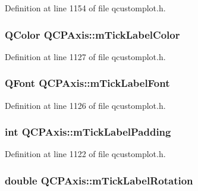 Definition at line 1154 of file qcustomplot.\-h.

\hypertarget{class_q_c_p_axis_a6384a749b3b56a97df081d8082321ab4}{
\subsubsection[{m\-Tick\-Label\-Color}]{\setlength{\rightskip}{0pt plus 5cm}Q\-Color Q\-C\-P\-Axis\-::m\-Tick\-Label\-Color\hspace{0.3cm}{\ttfamily [protected]}}}\label{class_q_c_p_axis_a6384a749b3b56a97df081d8082321ab4}


Definition at line 1127 of file qcustomplot.\-h.

\hypertarget{class_q_c_p_axis_add79d1e39c4ed65869a1e9cc79043f3f}{
\subsubsection[{m\-Tick\-Label\-Font}]{\setlength{\rightskip}{0pt plus 5cm}Q\-Font Q\-C\-P\-Axis\-::m\-Tick\-Label\-Font\hspace{0.3cm}{\ttfamily [protected]}}}\label{class_q_c_p_axis_add79d1e39c4ed65869a1e9cc79043f3f}


Definition at line 1126 of file qcustomplot.\-h.

\hypertarget{class_q_c_p_axis_ab3f2f5d923c83d952922149d0d1e2eb1}{
\subsubsection[{m\-Tick\-Label\-Padding}]{\setlength{\rightskip}{0pt plus 5cm}int Q\-C\-P\-Axis\-::m\-Tick\-Label\-Padding\hspace{0.3cm}{\ttfamily [protected]}}}\label{class_q_c_p_axis_ab3f2f5d923c83d952922149d0d1e2eb1}


Definition at line 1122 of file qcustomplot.\-h.

\hypertarget{class_q_c_p_axis_a47660c8694884cdb87495bf8b4c8a3b9}{
\subsubsection[{m\-Tick\-Label\-Rotation}]{\setlength{\rightskip}{0pt plus 5cm}double Q\-C\-P\-Axis\-::m\-Tick\-Label\-Rotation\hspace{0.3cm}{\ttfamily [protected]}}}\label{class_q_c_p_axis_a47660c8694884cdb87495bf8b4c8a3b9}


